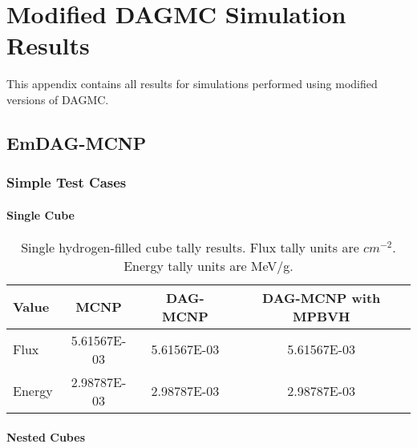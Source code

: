 
\chapter{Modified DAGMC Simulation Results}\label{ch:appendix-c}

This appendix contains all results for simulations performed using modified
versions of DAGMC.

\section{EmDAG-MCNP}

\subsection{Simple Test Cases}
  \subsubsection{Single Cube}

  \begin{table}[H]
    \small
    \begin{center}
      \begin{tabular}{lccc}
        \toprule
        Value & MCNP & DAG-MCNP & DAG-MCNP with MPBVH \\
        \toprule
        \hline
        Flux   & 5.61567E-03 & 5.61567E-03 & 5.61567E-03 \\
        Energy & 2.98787E-03 & 2.98787E-03 & 2.98787E-03 \\
        \bottomrule
      \end{tabular}
      \caption[Single hydrogen-filled cube tally results.]{Single
        hydrogen-filled cube tally results. Flux tally units are
        $cm^{-2}$. Energy tally units are MeV/g.}
      \label{nestedspheres}
    \end{center}
  \end{table}


  \subsubsection{Nested Cubes}

